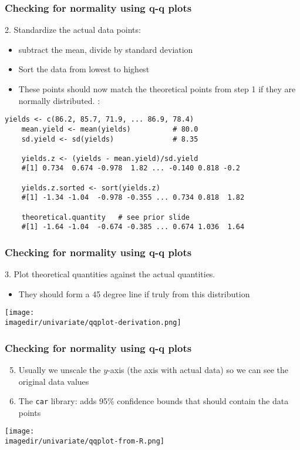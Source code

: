 \begin{frame}[fragile]\frametitle{Checking for normality using q-q plots}
	2. Standardize the actual data points:
	\begin{itemize}
		\item	subtract the mean, divide by standard deviation
		\item	Sort the data from lowest to highest
		\item	These points should now match the theoretical points from step 1 if they are normally distributed. \emph{{\color{myGreen}{Example}}}:
	\end{itemize}

	\begin{lstlisting}[R]
	yields <- c(86.2, 85.7, 71.9, ... 86.9, 78.4)
	mean.yield <- mean(yields)          # 80.0
	sd.yield <- sd(yields)              # 8.35

	yields.z <- (yields - mean.yield)/sd.yield
	#[1] 0.734  0.674 -0.978  1.82 ... -0.140 0.818 -0.2

	yields.z.sorted <- sort(yields.z)
	#[1] -1.34 -1.04  -0.978 -0.355 ... 0.734 0.818  1.82

	theoretical.quantity   # see prior slide
	#[1] -1.64 -1.04  -0.674 -0.385 ... 0.674 1.036  1.64
	\end{lstlisting}
\end{frame}

\begin{frame}\frametitle{Checking for normality using q-q plots}

	3. Plot theoretical quantities against the actual quantities.
	\begin{itemize}
		\item	\small They should form a 45 degree line if truly from this distribution
	\end{itemize}
	\begin{center}
		\texttt{[image: \\imagedir/univariate/qqplot-derivation.png]}
	\end{center}
\end{frame}

\begin{frame}\frametitle{Checking for normality using q-q plots}
	\begin{enumerate}
		\setcounter{enumii}{4}
		\item	Usually we unscale the $y$-axis (the axis with actual data) so we can see the original data values
		\item	The \texttt{car} library: adds 95\% confidence bounds that should contain the data points
	\end{enumerate}
	\vspace{-8pt}
	\begin{center}
		\texttt{[image: \\imagedir/univariate/qqplot-from-R.png]}

	\end{center}

\end{frame}

